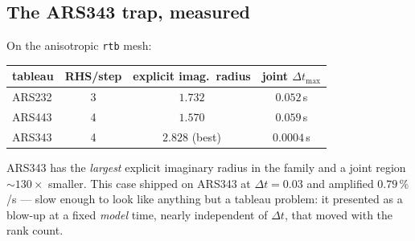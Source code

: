 \documentclass[11pt,a4paper]{article}
\begin{document}
\subsection{The ARS343 trap, measured}
On the anisotropic \texttt{rtb} mesh:
\begin{center}
\begin{tabular}{lccc}
\toprule
tableau & RHS/step & explicit imag.\ radius & joint $\Delta t_{\max}$ \\
\midrule
ARS232 & 3 & $1.732$ & $\bm{0.052}$\,s \\
ARS443 & 4 & $1.570$ & $0.059$\,s \\
ARS343 & 4 & $\bm{2.828}$ (best) & $\bm{0.0004}$\,s \\
\bottomrule
\end{tabular}
\end{center}
ARS343 has the \emph{largest} explicit imaginary radius in the family and a
joint region $\sim\!130\times$ smaller. This case shipped on ARS343 at
$\Delta t=0.03$ and amplified $0.79\,\%$/s --- slow enough to look like
anything but a tableau problem: it presented as a blow-up at a fixed
\emph{model} time, nearly independent of $\Delta t$, that moved with the rank
count.
\end{document}

